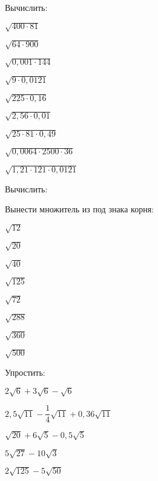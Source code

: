 %
\begin{class}[number=4]
	\begin{listofex}
		\item Вычислить:
		\begin{enumcols}[itemcolumns=3]
			\item \( \sqrt{400\cdot81} \)
			\item \( \sqrt{64\cdot900} \)
			\item \( \sqrt{0,001\cdot144} \)
			\item \( \sqrt{9\cdot0,0121} \)
			\item \( \sqrt{225\cdot0,16} \)
			\item \( \sqrt{2,56\cdot0,01} \)
			\item \( \sqrt{25\cdot81\cdot0,49} \)
			\item \( \sqrt{0,0064\cdot2500\cdot36} \)
			\item \( \sqrt{1,21\cdot121\cdot0,0121} \)
		\end{enumcols}
		\item Вычислить:
		\begin{enumcols}[itemcolumns=2]
			\item {}
			\item {}
		\end{enumcols}
		\item Вынести множитель из под знака корня:
		\begin{enumcols}[itemcolumns=8]
			\item \( \sqrt{12} \)
			\item \( \sqrt{20} \)
			\item \( \sqrt{40} \)
			\item \( \sqrt{125} \)
			\item \( \sqrt{72} \)
			\item \( \sqrt{288} \)
			\item \( \sqrt{360} \)
			\item \( \sqrt{500} \)
		\end{enumcols}
		\item Упростить:
		\begin{enumcols}[itemcolumns=3]
			\item \( 2\sqrt{6}+3\sqrt{6}-\sqrt{6} \)
			\item \( 2,5\sqrt{11}-\dfrac{1}{4}\sqrt{11}+0,36\sqrt{11} \)
			\item \( \sqrt{20}+6\sqrt{5}-0,5\sqrt{5} \)
			\item \( 5\sqrt{27}-10\sqrt{3} \)
			\item \( 2\sqrt{125}-5\sqrt{50} \)

\end{enumcols}
\end{listofex}
\end{class}
